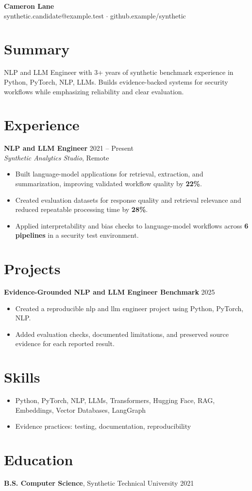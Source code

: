 \documentclass[10pt,letterpaper]{article}
\newcommand{\resumeItem}[1]{\item #1}
\newcommand{\resumeItemListStart}{\begin{itemize}[leftmargin=*]}
\newcommand{\resumeItemListEnd}{\end{itemize}}
\begin{document}
\begin{center}
{\Large \textbf{Cameron Lane}}\\
synthetic.candidate@example.test $\cdot$ github.example/synthetic
\end{center}

\section*{Summary}
NLP and LLM Engineer with 3+ years of synthetic benchmark experience in Python, PyTorch, NLP, LLMs. Builds evidence-backed systems for security workflows while emphasizing reliability and clear evaluation.

\section*{Experience}
\textbf{NLP and LLM Engineer} \hfill 2021 -- Present\\
\textit{Synthetic Analytics Studio}, Remote
\resumeItemListStart
  \resumeItem{Built language-model applications for retrieval, extraction, and summarization, improving validated workflow quality by \textbf{22\%}.}
  \resumeItem{Created evaluation datasets for response quality and retrieval relevance and reduced repeatable processing time by \textbf{28\%}.}
  \resumeItem{Applied interpretability and bias checks to language-model workflows across \textbf{6 pipelines} in a security test environment.}
\resumeItemListEnd

\section*{Projects}
\textbf{Evidence-Grounded NLP and LLM Engineer Benchmark} \hfill 2025
\resumeItemListStart
  \resumeItem{Created a reproducible nlp and llm engineer project using Python, PyTorch, NLP.}
  \resumeItem{Added evaluation checks, documented limitations, and preserved source evidence for each reported result.}
\resumeItemListEnd

\section*{Skills}
\resumeItemListStart
  \resumeItem{Python, PyTorch, NLP, LLMs, Transformers, Hugging Face, RAG, Embeddings, Vector Databases, LangGraph}
  \resumeItem{Evidence practices: testing, documentation, reproducibility}
\resumeItemListEnd

\section*{Education}
\textbf{B.S. Computer Science}, Synthetic Technical University \hfill 2021
\end{document}
